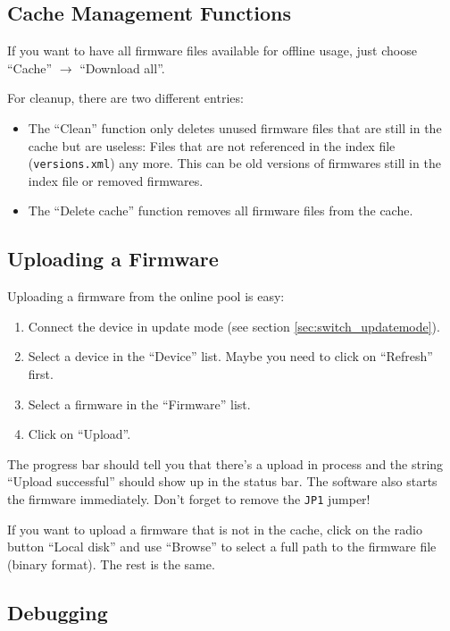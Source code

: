 \documentclass[bibtotoc,UKenglish,halfparskip,oneside,DIV12]{scrreprt}
\begin{document}
\subsection{Cache Management Functions}

If you want to have all firmware files available for offline usage, just choose ``Cache''
$\rightarrow$ ``Download all''.

For cleanup, there are two different entries:

\begin{itemize}
  \item The ``Clean'' function only deletes unused firmware files that are still in the cache but
    are useless: Files that are not referenced in the index file (\texttt{versions.xml}) any more.
    This can be old versions of firmwares still in the index file or removed firmwares.

  \item The ``Delete cache'' function removes all firmware files from the cache.
\end{itemize}


\subsection{Uploading a Firmware}

Uploading a firmware from the online pool is easy:

\begin{enumerate}
  \item Connect the device in update mode (see section \vref{sec:switch_updatemode}).
  \item Select a device in the ``Device'' list. Maybe you need to click on ``Refresh'' first.
  \item Select a firmware in the ``Firmware'' list.
  \item Click on ``Upload''.
\end{enumerate}

The progress bar should tell you that there's a upload in process and the string ``Upload
successful'' should show up in the status bar. The software also starts the firmware immediately.
Don't forget to remove the \texttt{JP1} jumper!

If you want to upload a firmware that is not in the cache, click on the radio button ``Local disk''
and use ``Browse'' to select a full path to the firmware file (binary format). The rest is the same.

\subsection{Debugging}
\end{document}
